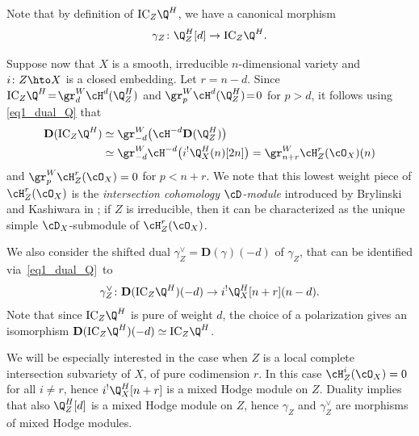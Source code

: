 Note that by definition of $\mathrm{IC}_Z\Q^H$, we have a canonical morphism
\begin{equation}\label{def_gamma}
\gamma_Z\colon\Q_Z^H[d]\to \mathrm{IC}_Z\Q^H.
\end{equation}

Suppose now that $X$ is a smooth, irreducible $n$-dimensional variety and $i\colon Z\hto X$ is a closed embedding. Let $r\!=\!n-d$.
Since $\mathrm{IC}_Z\Q^H\!=\!\gr^W_d\cH^d(\Q_Z^H)$ and $\gr^W_p\cH^d(\Q_Z^H)\!=\!0$ for $p>d$, it follows using \eqref{eq1_dual_Q} that
\begin{equation}\label{eq_dual_IC}
\begin{aligned}
{\mathbf D}(\mathrm{IC}_Z\Q^H)&\simeq\gr^W_{-d}\big(\cH^{-d}{\mathbf D}(\Q_Z^H)\big)\\
&\simeq\gr^W_{-d}\cH^{-d}\big(i^!\Q_X^H(n)[2n]\big)=\gr^W_{n+r}\cH^r_Z(\cO_X)(n)
\end{aligned}
\end{equation}
and $\gr^W_p\cH^r_Z(\cO_X)=0$ for $p<n+r$. We note that this lowest
weight piece of $\cH^r_Z(\cO_X)$ is the \emph{intersection cohomology $\cD$-module} introduced by Brylinski and Kashiwara in \cite{BK};
if $Z$ is irreducible, then it can be characterized as the unique simple $\cD_X$\nobreakdash-sub\-module of $\cH^r_Z(\cO_X)$.

We also consider the shifted dual $\gamma_Z^{\vee}={\mathbf D}(\gamma)(-d)$ of $\gamma_Z$, that can be identified via~\eqref{eq1_dual_Q}~to
\begin{equation}\label{def_gamma_2}
\gamma_Z^{\vee}\colon {\mathbf D}(\mathrm{IC}_Z\Q^H)(-d)\to i^!\Q_X^H[n+r](n-d).
\end{equation}
Note that since $\mathrm{IC}_Z\Q^H$ is pure of weight $d$, the choice of a polarization gives an isomorphism
${\mathbf D}(\mathrm{IC}_Z\Q^H)(-d)\simeq \mathrm{IC}_Z\Q^H$.

We will be especially interested in the case when $Z$ is a local complete intersection subvariety of $X$, of pure codimension $r$.
In this case $\cH^i_Z(\cO_X)=0$ for all $i\neq r$, hence $i^!\Q_X^H[n+r]$ is a mixed Hodge module on $Z$. Duality implies that
also $\Q_Z^H[d]$ is a mixed Hodge module on $Z$, hence $\gamma_Z$ and $\gamma_Z^{\vee}$ are morphisms of mixed Hodge
modules.

